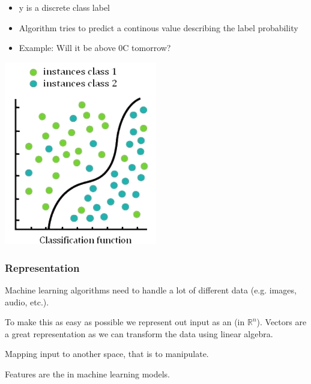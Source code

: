 \documentclass[
../../EiKI_Summary.tex,
]
{subfiles}
\begin{document}
\begin{minipage}
    [t]{0.5\textwidth}
    \begin{defbox}
        \begin{itemize}
            \item y is a discrete class label
            \item Algorithm tries to predict a continous value describing the label probability
            \item Example: Will it be above 0\degree C tomorrow?
        \end{itemize}

        \begin{center}
            \includegraphics[width=0.5\textwidth]{Pics/11/ClassificationFunction.png}
        \end{center}
    \end{defbox}
\end{minipage}

\subsubsection{Representation}
Machine learning algorithms need to handle a lot of different data (e.g. images, audio, etc.). 

To make this as easy as possible we represent out input as an  (in $\mathbb{R}^n$). Vectors are a great representation as we can transform the data using linear algebra. 

\begin{defbox}
    [Representation]
    Mapping input to another space, that is  to manipulate.
\end{defbox}

\begin{defbox}
    [Feature]
    Features are the  in machine learning models.
\end{defbox}
\end{document}

